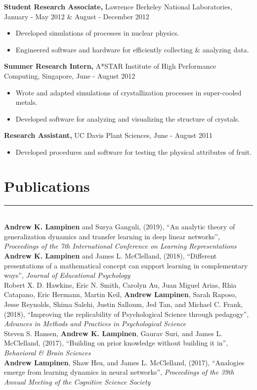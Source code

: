 \documentclass[margin]{res}
\begin{document}
\begin{resume}
 {\bf Student Research Associate,} Lawrence Berkeley National Laboratories, January - May 2012 \& August - December 2012
\begin{itemize} \itemsep -2pt
  \item Developed simulations of processes in nuclear physics. \item Engineered software and hardware for efficiently collecting \& analyzing data. \end{itemize}\vspace{-8pt}
{\bf Summer Research Intern,} A*STAR Institute of High Performance Computing, Singapore, June - August 2012
\begin{itemize} \itemsep -2pt
  \item Wrote and adapted simulations of crystallization processes in super-cooled metals. \item Developed software for analyzing and visualizing the structure of crystals. \end{itemize}\vspace{-8pt}
{\bf Research Assistant,} UC Davis Plant Sciences, June - August 2011
 \begin{itemize} \itemsep -2pt
  \item Developed procedures and software for testing the physical attributes of fruit. \end{itemize}

\vspace{1pt}\section{Publications} \vspace{-15pt} \rule{\textwidth}{0.5pt} \\[3pt]
\textbf{Andrew K. Lampinen} and Surya Ganguli, (2019), {``An analytic theory of generalization dynamics and transfer learning in deep linear networks''}, \textit{Proceedings of the 7th International Conference on Learning Representations} \\[3pt] 
\textbf{Andrew K. Lampinen} and James L. McClelland, (2018), {``Different presentations of a mathematical concept can support learning in complementary ways''}, \textit{Journal of Educational Psychology} \\[3pt]
 Robert X. D. Hawkins, Eric N. Smith, Carolyn Au, Juan Miguel Arias, Rhia Catapano, Eric Hermann, Martin Keil, \textbf{Andrew Lampinen}, Sarah Raposo, Jesse Reynolds, Shima Salehi, Justin Salloum, Jed Tan, and Michael C. Frank, (2018), {``Improving the replicability of Psychological Science through pedagogy''},  \textit{Advances in Methods and Practices in Psychological Science} \\ [3pt]
Steven S. Hansen, \textbf{Andrew K. Lampinen}, Gaurav Suri, and James L. McClelland, (2017), {``Building on prior knowledge without building it in''}, \textit{Behavioral \& Brain Sciences}  \\[3pt]
\textbf{Andrew Lampinen}, Shaw Hsu, and James L. McClelland, (2017), {``Analogies emerge from learning dynamics in neural networks''}, \textit{Proceedings of the 39th Annual Meeting of the Cognitive Science Society}  


\end{resume}
\end{document}
